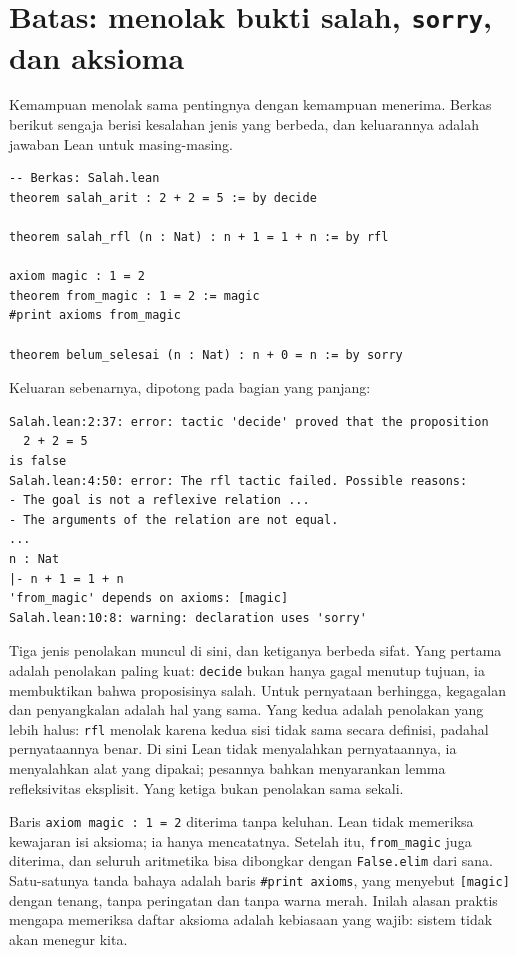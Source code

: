 \section{Batas: menolak bukti salah, \texttt{sorry}, dan aksioma}


Kemampuan menolak sama pentingnya dengan kemampuan menerima. Berkas berikut sengaja berisi
kesalahan jenis yang berbeda, dan keluarannya adalah jawaban Lean untuk masing-masing.

\begin{verbatim}
-- Berkas: Salah.lean
theorem salah_arit : 2 + 2 = 5 := by decide

theorem salah_rfl (n : Nat) : n + 1 = 1 + n := by rfl

axiom magic : 1 = 2
theorem from_magic : 1 = 2 := magic
#print axioms from_magic

theorem belum_selesai (n : Nat) : n + 0 = n := by sorry
\end{verbatim}

Keluaran sebenarnya, dipotong pada bagian yang panjang:

\begin{verbatim}
Salah.lean:2:37: error: tactic 'decide' proved that the proposition
  2 + 2 = 5
is false
Salah.lean:4:50: error: The rfl tactic failed. Possible reasons:
- The goal is not a reflexive relation ...
- The arguments of the relation are not equal.
...
n : Nat
|- n + 1 = 1 + n
'from_magic' depends on axioms: [magic]
Salah.lean:10:8: warning: declaration uses 'sorry'
\end{verbatim}

Tiga jenis penolakan muncul di sini, dan ketiganya berbeda sifat. Yang pertama adalah penolakan
paling kuat: \texttt{decide} bukan hanya gagal menutup tujuan, ia membuktikan bahwa proposisinya
salah. Untuk pernyataan berhingga, kegagalan dan penyangkalan adalah hal yang sama. Yang kedua
adalah penolakan yang lebih halus: \texttt{rfl} menolak karena kedua sisi tidak sama secara
definisi, padahal pernyataannya benar. Di sini Lean tidak menyalahkan pernyataannya, ia
menyalahkan alat yang dipakai; pesannya bahkan menyarankan lemma refleksivitas eksplisit. Yang
ketiga bukan penolakan sama sekali.

Baris \texttt{axiom magic : 1 = 2} diterima tanpa keluhan. Lean tidak memeriksa kewajaran isi
aksioma; ia hanya mencatatnya. Setelah itu, \texttt{from\_magic} juga diterima, dan seluruh
aritmetika bisa dibongkar dengan \texttt{False.elim} dari sana. Satu-satunya tanda bahaya adalah
baris \texttt{\#print axioms}, yang menyebut \texttt{[magic]} dengan tenang, tanpa peringatan
dan tanpa warna merah. Inilah alasan praktis mengapa memeriksa daftar aksioma adalah kebiasaan
yang wajib: sistem tidak akan menegur kita.

